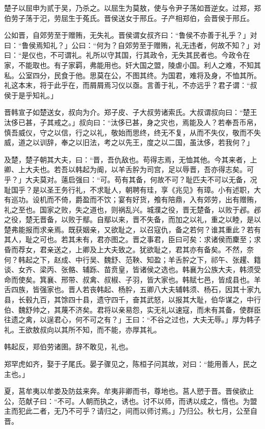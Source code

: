 \documentclass[]{article}
\begin{document}
楚子以屈申为贰于吴，乃杀之。以屈生为莫敖，使与令尹子荡如晋逆女。过郑，郑伯劳子荡于汜，劳屈生于菟氏。晋侯送女于邢丘。子产相郑伯，会晋侯于邢丘。

公如晋，自郊劳至于赠贿，无失礼。晋侯谓女叔齐曰：``鲁侯不亦善于礼乎？」对曰：``鲁侯焉知礼？」公曰：``何为？自郊劳至于赠贿，礼无违者，何故不知？」对曰：``是仪也，不可谓礼。礼所以守其国，行其政令，无失其民者也。今政令在家，不能取也。有子家羁，弗能用也。奸大国之盟，陵虐小国。利人之难，不知其私。公室四分，民食于他。思莫在公，不图其终。为国君，难将及身，不恤其所。礼这本末，将于此乎在，而屑屑焉习仪以亟。言善于礼，不亦远乎？君子谓：``叔侯于是乎知礼。」

晋韩宣子如楚送女，叔向为介。郑子皮、子大叔劳诸索氏。大叔谓叔向曰：``楚王汰侈已甚，子其戒之。」叔向曰：``汰侈已甚，身之灾也，焉能及人？若奉吾币帛，慎吾威仪，守之以信，行之以礼，敬始而思终，终无不复，从而不失仪，敬而不失威，道之以训辞，奉之以旧法，考之以先王，度之以二国，虽汰侈，若我何？」

及楚，楚子朝其大夫，曰：``晋，吾仇敌也。苟得志焉，无恤其他。今其来者，上卿、上大夫也。若吾以韩起为阍，以羊舌肸为司宫，足以辱晋，吾亦得志矣。可乎？」大夫莫对。薳启强曰：``可。苟有其备，何故不可？耻匹夫不可以无备，况耻国乎？是以圣王务行礼，不求耻人，朝聘有珪，享《兆见》有璋。小有述职，大有巡功。设机而不倚，爵盈而不饮；宴有好货，飧有陪鼎，入有郊劳，出有赠贿，礼之至也。国家之败，失之道也，则祸乱兴。城濮之役，晋无楚备，以败于邲。邲之役，楚无晋备，以败于鄢。自鄢以来，晋不失备，而加之以礼，重之以睦，是以楚弗能报而求亲焉。既获姻亲，又欲耻之，以召寇仇，备之若何？谁其重此？若有其人，耻之可也。若其未有，君亦图之。晋之事君，臣曰可矣：求诸侯而麇至；求昏而荐女，君亲送之，上卿及上大夫致之。犹欲耻之，君其亦有备矣。不然，奈何？韩起之下，赵成、中行吴、魏舒、范鞅、知盈；羊舌肸之下，祁午、张趯、籍谈、女齐、梁丙、张骼、辅跞、苗贲皇，皆诸侯之选也。韩襄为公族大夫，韩须受命而使矣。箕襄、邢带、叔禽、叔椒、子羽，皆大家也。韩赋七邑，皆成县也。羊舌四族，皆强家也。晋人若丧韩起、杨肸，五卿八大夫辅韩须、杨石，因其十家九县，长毂九百，其馀四十县，遗守四千，奋其武怒，以报其大耻，伯华谋之，中行伯、魏舒帅之，其蔑不济矣。君将以亲易怨，实无礼以速寇，而未有其备，使群臣往遗之禽，以逞君心，何不可之有？」王曰：``不谷之过也，大夫无辱。」厚为韩子礼。王欲敖叔向以其所不知，而不能，亦厚其礼。

韩起反，郑伯劳诸圉。辞不敢见，礼也。

郑罕虎如齐，娶于子尾氏。晏子骤见之，陈桓子问其故，对曰：``能用善人，民之主也。」

夏，莒牟夷以牟娄及防兹来奔。牟夷非卿而书，尊地也。莒人愬于晋。晋侯欲止公，范献子曰：``不可。人朝而执之，诱也。讨不以师，而诱以成之，惰也。为盟主而犯此二者，无乃不可乎？请归之，间而以师讨焉。」乃归公。秋七月，公至自晋。
\end{document}
